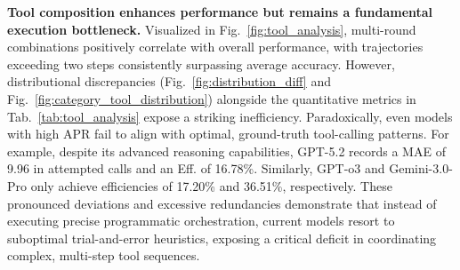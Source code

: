 \documentclass[runningheads]{llncs}
\begin{document}

\noindent \textbf{Tool composition enhances performance but remains a fundamental execution bottleneck.} Visualized in Fig.~\ref{fig:tool_analysis}, multi-round combinations positively correlate with overall performance, with trajectories exceeding two steps consistently surpassing average accuracy. However, distributional discrepancies (Fig.~\ref{fig:distribution_diff} and Fig.~\ref{fig:category_tool_distribution}) alongside the quantitative metrics in Tab.~\ref{tab:tool_analysis} expose a striking inefficiency. Paradoxically, even models with high APR fail to align with optimal, ground-truth tool-calling patterns. For example, despite its advanced reasoning capabilities, GPT-5.2 records a MAE of 9.96 in attempted calls and an Eff. of 16.78\%. Similarly, GPT-o3 and Gemini-3.0-Pro only achieve efficiencies of 17.20\% and 36.51\%, respectively. These pronounced deviations and excessive redundancies demonstrate that instead of executing precise programmatic orchestration, current models resort to suboptimal trial-and-error heuristics, exposing a critical deficit in coordinating complex, multi-step tool sequences.
\end{document}
